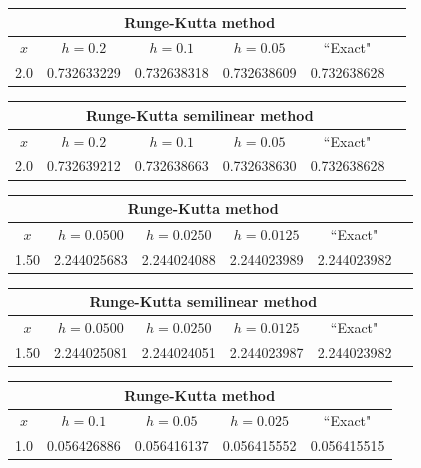 {\small
\begin{tabular}{|c|r|r|r|r|r|}
\hline
\multicolumn{5}{|c|}{Runge-Kutta method}\\\hline
\multicolumn{1}{|c|}{$x$}&
\multicolumn{1}{|c|}{$h=0.2$}&
\multicolumn{1}{|c|}{$h=0.1$}&
\multicolumn{1}{|c|}{$h=0.05$}&
\multicolumn{1}{|c|}{``Exact"}\\ \hline
2.0 & 0.732633229 & 0.732638318 & 0.732638609 & 0.732638628 \\
\hline
\end{tabular}}\bigskip

\hspace{.75in}
{\small
\begin{tabular}{|c|r|r|r|r|r|}
\hline
\multicolumn{5}{|c|}{Runge-Kutta semilinear method}\\\hline
\multicolumn{1}{|c|}{$x$}&
\multicolumn{1}{|c|}{$h=0.2$}&
\multicolumn{1}{|c|}{$h=0.1$}&
\multicolumn{1}{|c|}{$h=0.05$}&
\multicolumn{1}{|c|}{``Exact"}\\ \hline
2.0 & 0.732639212 & 0.732638663 & 0.732638630 & 0.732638628 \\
\hline
\end{tabular}}\bigskip

{\small
\begin{tabular}{|c|r|r|r|r|r|}
\hline
\multicolumn{5}{|c|}{Runge-Kutta method}\\\hline
\multicolumn{1}{|c|}{$x$}&
\multicolumn{1}{|c|}{$h=0.0500$}&
\multicolumn{1}{|c|}{$h=0.0250$}&
\multicolumn{1}{|c|}{$h=0.0125$}&
\multicolumn{1}{|c|}{``Exact"}\\ \hline
1.50 & 2.244025683 &2.244024088  & 2.244023989 & 2.244023982 \\
\hline
\end{tabular}}\bigskip

\hspace{.75in}
{\small
\begin{tabular}{|c|r|r|r|r|r|}
\hline
\multicolumn{5}{|c|}{Runge-Kutta semilinear method}\\\hline
\multicolumn{1}{|c|}{$x$}&
\multicolumn{1}{|c|}{$h=0.0500$}&
\multicolumn{1}{|c|}{$h=0.0250$}&
\multicolumn{1}{|c|}{$h=0.0125$}&
\multicolumn{1}{|c|}{``Exact"}\\ \hline
1.50 & 2.244025081 & 2.244024051 & 2.244023987 & 2.244023982 \\
\hline
\end{tabular}}\bigskip

{\small
\begin{tabular}{|c|r|r|r|r|}
\hline
\multicolumn{5}{|c|}{Runge-Kutta method}\\\hline
\multicolumn{1}{|c|}{$x$}&
\multicolumn{1}{|c|}{$h=0.1$}&
\multicolumn{1}{|c|}{$h=0.05$}&
\multicolumn{1}{|c|}{$h=0.025$}&
\multicolumn{1}{|c|}{``Exact"}\\ \hline
1.0 & 0.056426886 & 0.056416137 & 0.056415552 & 0.056415515 \\
\hline
\end{tabular}}\bigskip
\medskip

